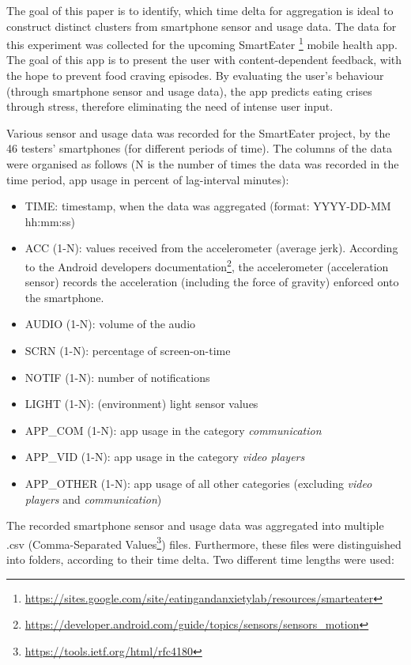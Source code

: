 

The goal of this paper is to identify, which time delta for aggregation is ideal to construct distinct clusters from smartphone sensor and usage data. The data for this experiment was collected for the upcoming SmartEater \footnote{\url{https://sites.google.com/site/eatingandanxietylab/resources/smarteater}} mobile health app. The goal of this app is to present the user with content-dependent feedback, with the hope to prevent food craving episodes. By evaluating the user's behaviour (through smartphone sensor and usage data), the app predicts eating crises through stress, therefore eliminating the need of intense user input. 

Various sensor and usage data was recorded for the SmartEater project, by the 46 testers' smartphones (for different periods of time). The columns of the data were organised as follows (N is the number of times the data was recorded in the time period, app usage in percent of lag-interval minutes):
 

\begin{itemize}
	\item TIME: timestamp, when the data was aggregated (format: YYYY-DD-MM hh:mm:ss)
	\item ACC (1-N): values received from the accelerometer (average jerk). According to the Android developers documentation\footnote{\url{https://developer.android.com/guide/topics/sensors/sensors_motion}}, the accelerometer (acceleration sensor) records the acceleration (including the force of gravity) enforced onto the smartphone. 
	\item AUDIO (1-N): volume of the audio 
	\item SCRN (1-N): percentage of screen-on-time
	\item NOTIF (1-N): number of notifications
	\item LIGHT (1-N): (environment) light sensor values
	\item APP\_COM (1-N): app usage in the category \textit{communication} 
	\item APP\_VID (1-N): app usage in the category \textit{video players}
	\item APP\_OTHER (1-N): app usage of all other categories (excluding \textit{video players} and \textit{communication})
\end{itemize}


The recorded smartphone sensor and usage data was aggregated into multiple .csv (Comma-Separated Values\footnote{\url{https://tools.ietf.org/html/rfc4180}}) files. Furthermore, these files were distinguished into folders, according to their time delta. Two different time lengths were used:

